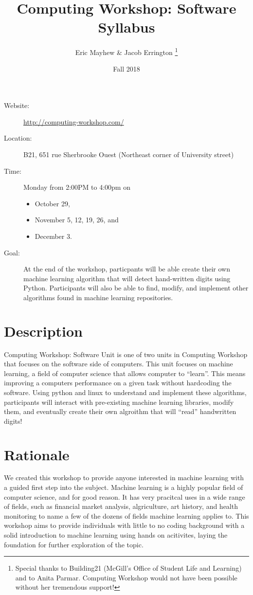 \documentclass[11pt]{article}
\author{%
  Eric Mayhew \& Jacob Errington%
  \footnote{%
    Special thanks to Building21 (McGill's Office of Student Life and Learning)
    and to Anita Parmar.
    Computing Workshop would not have been possible without her tremendous
    support!
  }
}
\title{Computing Workshop: Software Syllabus}
\date{Fall 2018}
\begin{document}
\maketitle

\begin{description}
  \item[Website:]
    \url{http://computing-workshop.com/}

  \item[Location:]
    B21, 651 rue Sherbrooke Ouest
    (Northeast corner of University street)

  \item[Time:]
    Monday from 2:00PM to 4:00pm on
    \begin{itemize}
    \item October 29,
    \item November 5, 12, 19, 26, and
    \item December 3.
    \end{itemize}

  \item[Goal:]
    At the end of the workshop, particpants will be able create their own
    machine learning algorithm that will detect hand-written
    digits using Python. Participants will also be able to find, modify, and implement other
    algorithms found in machine learning repositories.

\end{description}

\section*{Description}

Computing Workshop: Software Unit is one of two units in Computing Workshop that
focuses on the software side of computers. This unit focuses on machine
learning, a field of computer science that allows computer to ``learn''. This
means improving a computers performance on a given task without hardcoding the
software. Using python and linux to understand and implement these algorithms,
participants will interact with pre-existing machine learning libraries, modify
them, and eventually create their own algroithm that will ``read'' handwritten digits!

\section*{Rationale}

We created this workshop to provide anyone interested in machine learning with a
guided first step into the subject. Machine learning is a highly popular field
of computer science, and for good reason. It has very pracitcal uses in a wide
range of fields, such as financial market analysis, algriculture, art history,
and health monitoring to name a few of the dozens of fields machine learning
applies to. This workshop aims to provide individuals with little to no coding
background with a solid introduction to machine learning using hands on
acitivites, laying the foundation for further exploration of the topic.
\end{document}

